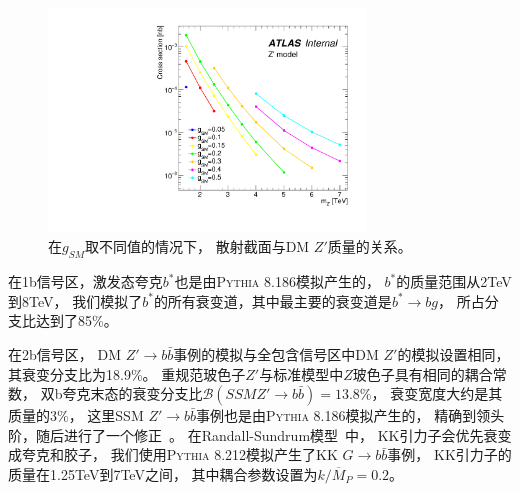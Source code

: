 \begin{figure}[thbp]
  \centering
  \includegraphics[width=0.75\textwidth]{figuresDijet/03-BenchmarkSignals/Xsec_Zprime.pdf}
  \caption{  
 在$g_{SM}$取不同值的情况下，
散射截面与DM $Z\prime$质量的关系。
  }
  \label{fig:Data2}
\end{figure}

在1b信号区，激发态夸克$b^*$也是由\textsc{Pythia 8.186}模拟产生的，
$b^*$的质量范围从2TeV到8TeV，
我们模拟了$b^*$的所有衰变道，其中最主要的衰变道是$b^*\to bg$，
所占分支比达到了85\%。

在2b信号区，
DM $Z\prime \to b\bar{b}$事例的模拟与全包含信号区中DM $Z\prime $的模拟设置相同，
其衰变分支比为18.9\%。
重规范玻色子$Z\prime$与标准模型中$Z$玻色子具有相同的耦合常数，
双b夸克末态的衰变分支比$\mathcal{B}(SSM Z\prime \to b\bar{b})=13.8\%$，
衰变宽度大约是其质量的3\%，
这里SSM $Z\prime \to b\bar{b}$事例也是由\textsc{Pythia 8.186}模拟产生的，
精确到领头阶，随后进行了一个修正~\cite{Alwall:2014hca}。
在Randall-Sundrum模型~\cite{RS1,RS2}中，
KK引力子会优先衰变成夸克和胶子，
我们使用\textsc{Pythia 8.212}模拟产生了KK $G \rightarrow b\bar{b}$事例，
KK引力子的质量在1.25TeV到7TeV之间，
其中耦合参数设置为$k/\overline{M}_P=0.2$。





